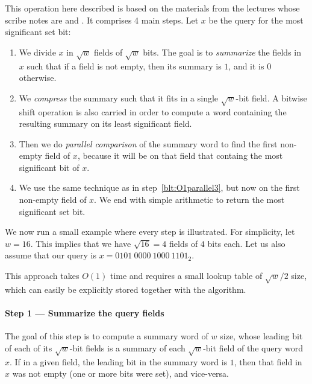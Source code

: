 This operation here described is based on the materials from the lectures whose scribe notes are \cite{nelsonjelanilec2} and \cite{erikdemainelec12}.
It comprises 4 main steps.
Let $x$ be the query for the most significant set bit:
\begin{enumerate}
    \item
    We divide $x$ in $\sqrt{w}$ fields of $\sqrt{w}$ bits. The goal is to \textit{summarize} the fields in $x$ such that if a field is not empty, then its summary is $1$, and it is $0$ otherwise.
    
    \item
    We \textit{compress} the summary such that it fits in a single $\sqrt{w}$-bit field. A bitwise shift operation is also carried in order to compute a word containing the resulting summary on its least significant field.
    
    \item \label{blt:O1parallel3}
    Then we do \textit{parallel comparison} of the summary word to find the first non-empty field of $x$, because it will be on that field that containg the most significant bit of $x$.
    
    \item
    We use the same technique as in step~\ref{blt:O1parallel3}, but now on the first non-empty field of $x$. We end with simple arithmetic to return the most significant set bit. 
\end{enumerate}

We now run a small example where every step is illustrated. For simplicity, let $w=16$. This implies that we have $\sqrt{16} = 4$ fields of $4$ bits each. Let us also assume that our query is $x = 0101\ 0000\ 1000\ 1101_2$.

This approach takes $O(1)$ time and requires a small lookup table of $\sqrt{w}/2$ size, which can easily be explicitly stored together with the algorithm.

\paragraph{Step 1 --- Summarize the query fields} \label{sec:summaryfields}

The goal of this step is to compute a summary word of $w$ size, whose leading bit of each of its $\sqrt{w}$-bit fields is a summary of each $\sqrt{w}$-bit field of the query word $x$. If in a given field, the leading bit in the summary word is $1$, then that field in $x$ was not empty (one or more bits were set), and vice-versa.


